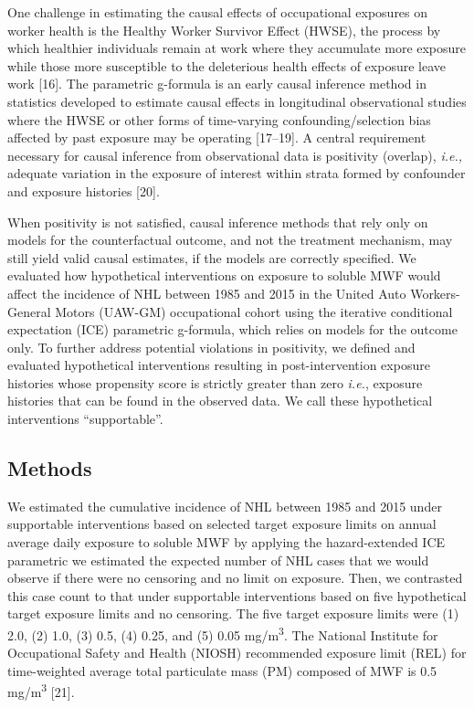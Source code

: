 \documentclass[
  11pt,
  letterpaper,
  DIV=11,
  numbers=noendperiod]{scrartcl}
\begin{document}
One challenge in estimating the causal effects of occupational exposures
on worker health is the Healthy Worker Survivor Effect (HWSE), the
process by which healthier individuals remain at work where they
accumulate more exposure while those more susceptible to the deleterious
health effects of exposure leave work {[}16{]}. The parametric g-formula
is an early causal inference method in statistics developed to estimate
causal effects in longitudinal observational studies where the HWSE or
other forms of time-varying confounding/selection bias affected by past
exposure may be operating {[}17--19{]}. A central requirement necessary
for causal inference from observational data is positivity (overlap),
\emph{i.e.,} adequate variation in the exposure of interest within
strata formed by confounder and exposure histories {[}20{]}.

When positivity is not satisfied, causal inference methods that rely
only on models for the counterfactual outcome, and not the treatment
mechanism, may still yield valid causal estimates, if the models are
correctly specified. We evaluated how hypothetical interventions on
exposure to soluble MWF would affect the incidence of NHL between 1985
and 2015 in the United Auto Workers-General Motors (UAW-GM) occupational
cohort using the iterative conditional expectation (ICE) parametric
g-formula, which relies on models for the outcome only. To further
address potential violations in positivity, we defined and evaluated
hypothetical interventions resulting in post-intervention exposure
histories whose propensity score is strictly greater than zero
\emph{i.e.}, exposure histories that can be found in the observed data.
We call these hypothetical interventions ``supportable''.

\subsection{Methods}\label{methods}

We estimated the cumulative incidence of NHL between 1985 and 2015 under
supportable interventions based on selected target exposure limits on
annual average daily exposure to soluble MWF by applying the
hazard-extended ICE parametric we estimated the expected number of NHL
cases that we would observe if there were no censoring and no limit on
exposure. Then, we contrasted this case count to that under supportable
interventions based on five hypothetical target exposure limits and no
censoring. The five target exposure limits were (1) 2.0, (2) 1.0, (3)
0.5, (4) 0.25, and (5) 0.05 mg/m\textsuperscript{3}. The National
Institute for Occupational Safety and Health (NIOSH) recommended
exposure limit (REL) for time-weighted average total particulate mass
(PM) composed of MWF is 0.5 mg/m\textsuperscript{3} {[}21{]}.
\end{document}
